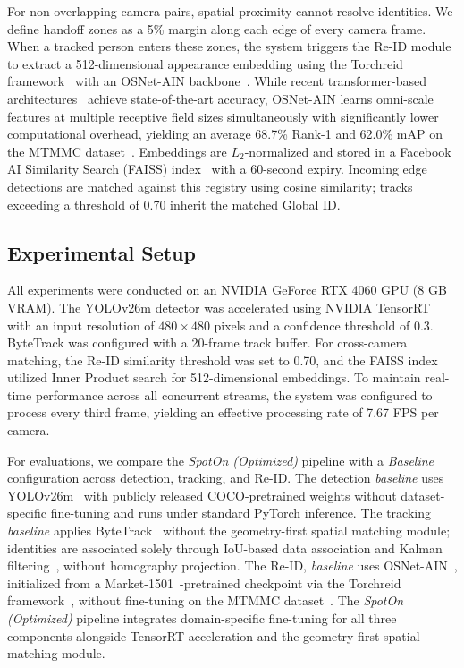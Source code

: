 \documentclass[conference]{IEEEtran}
\begin{document}
For non-overlapping camera pairs, spatial proximity cannot resolve identities. We define handoff zones as a 5\% margin along each edge of every camera frame. When a tracked person enters these zones, the system triggers the Re-ID module to extract a 512-dimensional appearance embedding using the Torchreid framework~\cite{torchreid} with an OSNet-AIN backbone~\cite{osnet}. While recent transformer-based architectures~\cite{transreid} achieve state-of-the-art accuracy, OSNet-AIN learns omni-scale features at multiple receptive field sizes simultaneously with significantly lower computational overhead, yielding an average 68.7\% Rank-1 and 62.0\% mAP on the MTMMC dataset~\cite{mtmmc}. Embeddings are $L_2$-normalized and stored in a Facebook AI Similarity Search (FAISS) index~\cite{faiss} with a 60-second expiry. Incoming edge detections are matched against this registry using cosine similarity; tracks exceeding a threshold of 0.70 inherit the matched Global ID.

\subsection{Experimental Setup}
\label{subsec:exp-setup}

All experiments were conducted on an NVIDIA GeForce RTX 4060 GPU (8 GB VRAM). The YOLOv26m detector was accelerated using NVIDIA TensorRT with an input resolution of $480 \times 480$ pixels and a confidence threshold of 0.3. ByteTrack was configured with a 20-frame track buffer. For cross-camera matching, the Re-ID similarity threshold was set to 0.70, and the FAISS index utilized Inner Product search for 512-dimensional embeddings. To maintain real-time performance across all concurrent streams, the system was configured to process every third frame, yielding an effective processing rate of 7.67 FPS per camera. 

For evaluations, we compare the \textit{SpotOn (Optimized)} pipeline with a \textit{Baseline} configuration across detection, tracking, and Re-ID. The detection \textit{baseline} uses YOLOv26m~\cite{yolov26m} with publicly released COCO-pretrained weights without dataset-specific fine-tuning and runs under standard PyTorch inference. The tracking \textit{baseline} applies ByteTrack~\cite{bytetrack} without the geometry-first spatial matching module; identities are associated solely through IoU-based data association and Kalman filtering~\cite{kalman}, without homography projection. The Re-ID, \textit{baseline} uses OSNet-AIN~\cite{osnet}, initialized from a Market-1501~\cite{market1501}-pretrained checkpoint via the Torchreid framework~\cite{torchreid}, without fine-tuning on the MTMMC dataset~\cite{mtmmc}. The \textit{SpotOn (Optimized)} pipeline integrates domain-specific fine-tuning for all three components alongside TensorRT acceleration and the geometry-first spatial matching module.
\end{document}
